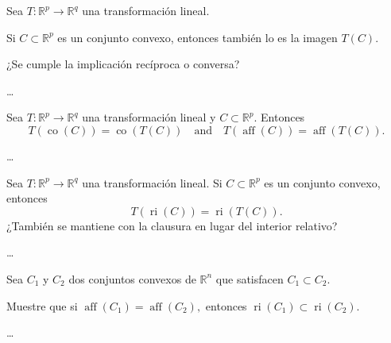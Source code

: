 \documentclass{testfcuni} %
\begin{document}
\begin{questions}
  \question

  Sea $T\colon\mathds{R}^{p}\to\mathds{R}^{q}$ una transformación lineal.

  Si $C\subset\mathds{R}^{p}$ es un conjunto convexo, entonces también lo es la imagen $T\left(C\right)$.

  ¿Se cumple la implicación recíproca o conversa?

  \begin{solution}
    \ldots
  \end{solution}

  \question

  Sea $T\colon\mathds{R}^{p}\rightarrow\mathds{R}^{q}$ una transformación lineal y $C\subset\mathds{R}^{p}$.
  Entonces
  \[
    T\left(\operatorname{co}\left(C\right)\right)=
    \operatorname{co}\left(T\left(C\right)\right)\quad
    \text{and}\quad
    T\left(\operatorname{aff}\left(C\right)\right)=
    \operatorname{aff}\left(T\left(C\right)\right).
  \]

  \begin{solution}
    \ldots
  \end{solution}

  \question

  Sea $T\colon\mathds{R}^{p}\rightarrow\mathds{R}^{q}$ una transformación lineal.
  Si $C\subset\mathds{R}^{p}$ es un conjunto convexo, entonces
  \[
    T\left(\operatorname{ri}\left(C\right)\right)=
    \operatorname{ri}\left(T\left(C\right)\right).
  \]
  ¿También se mantiene con la clausura en lugar del interior
  relativo?

  \begin{solution}
    \ldots
  \end{solution}

  \question

  Sea $C_{1}$ y $C_{2}$ dos conjuntos convexos de $\mathds{R}^{n}$ que satisfacen $C_{1}\subset C_{2}$.

  Muestre que si
  \begin{math}
    \operatorname{aff}
    \left(C_{1}\right)=
    \operatorname{aff}
    \left(C_{2}\right),
  \end{math}
  entonces
  \begin{math}
    \operatorname{ri}
    \left(C_{1}\right)\subset
    \operatorname{ri}
    \left(C_{2}\right).
  \end{math}

  \begin{solution}
    \ldots
  \end{solution}


\end{questions}
\end{document}
